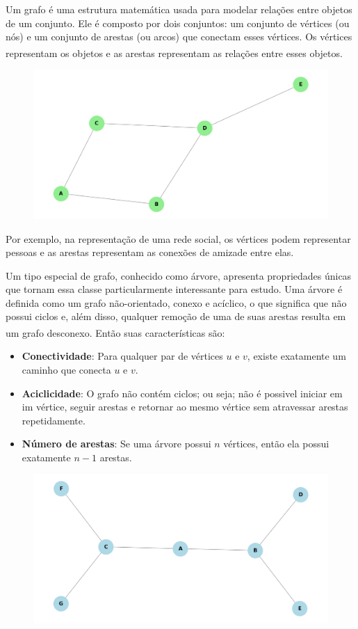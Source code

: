 \documentclass[12pt, a4paper]{scrreprt}
\begin{document}
Um grafo é uma estrutura matemática usada para modelar relações entre objetos de um conjunto. Ele é composto por dois conjuntos: um conjunto de vértices (ou nós) e um conjunto de arestas (ou arcos) que conectam esses vértices. Os vértices representam os objetos e as arestas representam as relações entre esses objetos. \textsuperscript{\cite{emilio2024grafos}}

\begin{figure}[h]
    \centering
    \includegraphics[width=.75\textwidth]{src/exemplo_simples_grafo.png}
    \label{fig:exemplo de grafo simples}
\end{figure}

Por exemplo, na representação de uma rede social, os vértices podem representar pessoas e as arestas representam as conexões de amizade entre elas.

Um tipo especial de grafo, conhecido como árvore, apresenta propriedades únicas que tornam essa classe particularmente interessante para estudo.
Uma árvore é definida como um grafo não-orientado, conexo e acíclico, o que significa que não possui ciclos e, além disso, qualquer remoção de uma de suas arestas resulta em um grafo desconexo.\textsuperscript{\cite{definicaoarvore}} Então suas características são:

\begin{itemize}
        \item \textbf{Conectividade}: Para qualquer par de vértices \( u \) e \( v \), existe exatamente um caminho que conecta \( u \) e \( v \).
        \item \textbf{Aciclicidade}: O grafo não contém ciclos; ou seja; não é possivel iniciar em im vértice, seguir arestas e retornar ao mesmo vértice sem atravessar arestas repetidamente.
        \item \textbf{Número de arestas}: Se uma árvore possui \( n \) vértices, então ela possui exatamente \( n - 1 \) arestas.
\end{itemize}

\begin{figure}[h]
    \centering
    \includegraphics[width=.75\textwidth]{src/arvore_exemplo.png}
    \label{fig:exemplo de árvore}
\end{figure}
\end{document}
